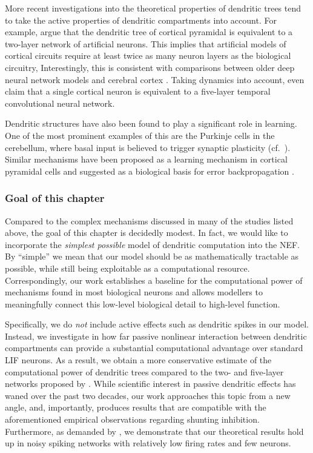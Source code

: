 More recent investigations into the theoretical properties of dendritic trees tend to take the active properties of dendritic compartments into account.
For example, \citet{poirazi2003pyramidal} argue that the dendritic tree of cortical pyramidal is equivalent to a two-layer network of artificial neurons.
This implies that artificial models of cortical circuits require at least twice as many neuron layers as the biological circuitry,
Interestingly, this is consistent with comparisons between older deep neural network models and cerebral cortex \citep[e.g.,][]{guclu2015deep}.
Taking dynamics into account, \citet{beniaguev2021single} even claim that a single cortical neuron is equivalent to a five-layer temporal convolutional neural network.

Dendritic structures have also been found to play a significant role in learning.
One of the most prominent examples of this are the Purkinje cells in the cerebellum, where basal input is believed to trigger synaptic plasticity (cf.~).
Similar mechanisms have been proposed as a learning mechanism in cortical pyramidal cells and suggested as a biological basis for error backpropagation \citep{richards2019dendritic,richards2019deep}.

\subsubsection{Goal of this chapter}
Compared to the complex mechanisms discussed in many of the studies listed above, the goal of this chapter is decidedly modest.
In fact, we would like to incorporate the \emph{simplest possible} model of dendritic computation into the NEF.
By \enquote{simple} we mean that our model should be as mathematically tractable as possible, while still being exploitable as a computational resource.
Correspondingly, our work establishes a baseline for the computational power of mechanisms found in most biological neurons and allows modellers to meaningfully connect this low-level biological detail to high-level function.

Specifically, we do \emph{not} include active effects such as dendritic spikes in our model.
Instead, we investigate in how far passive nonlinear interaction between dendritic compartments can provide a substantial computational advantage over standard LIF neurons.
As a result, we obtain a more conservative estimate of the computational power of dendritic trees compared to the two- and five-layer networks proposed by \citet{poirazi2003pyramidal,beniaguev2021single}.
While scientific interest in passive dendritic effects has waned over the past two decades, our work approaches this topic from a new angle, and, importantly, produces results that are compatible with the aforementioned empirical observations regarding shunting inhibition.
Furthermore, as demanded by \citet{london2005dendritic}, we demonstrate that our theoretical results hold up in noisy spiking networks with relatively low firing rates and few neurons.

